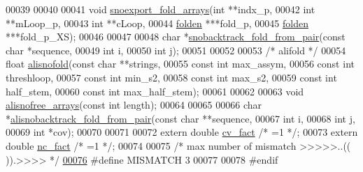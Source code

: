 \begin{DoxyCode}
00039 
00040 
00041 \textcolor{keywordtype}{void}   \mbox{\hyperlink{snofold_8h_a14752dbd6533360ca6fce26f1981fedd}{snoexport\_fold\_arrays}}(\textcolor{keywordtype}{int}    **indx\_p,
00042                              \textcolor{keywordtype}{int}    **mLoop\_p,
00043                              \textcolor{keywordtype}{int}    **cLoop,
00044                              \mbox{\hyperlink{group__data__structures_structnode}{folden}} ***fold\_p,
00045                              \mbox{\hyperlink{group__data__structures_structnode}{folden}} ***fold\_p\_XS);
00046 
00047 
00048 \textcolor{keywordtype}{char} *\mbox{\hyperlink{snofold_8h_a71682a6924926168cdbb66853f18bd3d}{snobacktrack\_fold\_from\_pair}}(\textcolor{keyword}{const} \textcolor{keywordtype}{char}  *sequence,
00049                                   \textcolor{keywordtype}{int}         i,
00050                                   \textcolor{keywordtype}{int}         j);
00051 
00052 
00053 \textcolor{comment}{/* alifold */}
00054 \textcolor{keywordtype}{float} \mbox{\hyperlink{snofold_8h_a5fe3b9abb7873252f2c743e4e74d41a3}{alisnofold}}(\textcolor{keyword}{const} \textcolor{keywordtype}{char} **strings,
00055                  \textcolor{keyword}{const} \textcolor{keywordtype}{int}  max\_assym,
00056                  \textcolor{keyword}{const} \textcolor{keywordtype}{int}  threshloop,
00057                  \textcolor{keyword}{const} \textcolor{keywordtype}{int}  min\_s2,
00058                  \textcolor{keyword}{const} \textcolor{keywordtype}{int}  max\_s2,
00059                  \textcolor{keyword}{const} \textcolor{keywordtype}{int}  half\_stem,
00060                  \textcolor{keyword}{const} \textcolor{keywordtype}{int}  max\_half\_stem);
00061 
00062 
00063 \textcolor{keywordtype}{void}  \mbox{\hyperlink{snofold_8h_a59d5349b76f780001138d206c61f4683}{alisnofree\_arrays}}(\textcolor{keyword}{const} \textcolor{keywordtype}{int} length);
00064 
00065 
00066 \textcolor{keywordtype}{char} *\mbox{\hyperlink{snofold_8h_a625399b54ae4b98303b78039eb78dd86}{alisnobacktrack\_fold\_from\_pair}}(\textcolor{keyword}{const} \textcolor{keywordtype}{char} **sequence,
00067                                      \textcolor{keywordtype}{int}        i,
00068                                      \textcolor{keywordtype}{int}        j,
00069                                      \textcolor{keywordtype}{int}        *cov);
00070 
00071 
00072 \textcolor{keyword}{extern} \textcolor{keywordtype}{double} \mbox{\hyperlink{snofold_8h_af3cbac6ff5d706d6e414677841ddf94c}{cv\_fact}} \textcolor{comment}{/* =1 */};
00073 \textcolor{keyword}{extern} \textcolor{keywordtype}{double} \mbox{\hyperlink{snofold_8h_a502948a122a2af5b914355b1f3ea2f61}{nc\_fact}} \textcolor{comment}{/* =1 */};
00074 
00075 \textcolor{comment}{/* max number of mismatch >>>>>..((   )).>>>> */}
\mbox{\hyperlink{snofold_8h_a37e3d25275c285015f9ac3e4b33634d8}{00076}} \textcolor{preprocessor}{#define MISMATCH 3}
00077 
00078 \textcolor{preprocessor}{#endif}
\end{DoxyCode}
